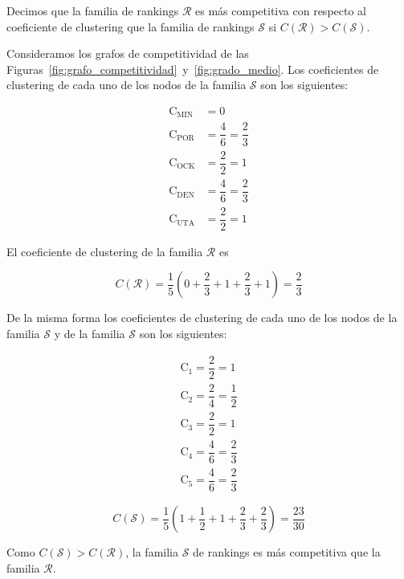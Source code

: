 \begin{defi}
Decimos que la familia de rankings $\mathcal{R}$ es más competitiva con respecto al coeficiente de clustering que la familia de rankings $\mathcal{S}$ si $C(\mathcal{R}) > C(\mathcal{S})$.
\end{defi}

\begin{ejemplo}
Consideramos los grafos de competitividad de las Figuras~\ref{fig:grafo_competitividad}~y~\ref{fig:grado_medio}. Los coeficientes de clustering de cada uno de los nodos de la familia $\mathcal{S}$ son los siguientes:

\begin{align*}
\mathrm{C}_\text{MIN} & =  0\\
\mathrm{C}_\text{POR} & = \dfrac{4}{6} = \dfrac{2}{3}\\
\mathrm{C}_\text{OCK} & = \dfrac{2}{2} = 1\\
\mathrm{C}_\text{DEN} & = \dfrac{4}{6} = \dfrac{2}{3}\\
\mathrm{C}_\text{UTA} & = \dfrac{2}{2} = 1
\end{align*}

El coeficiente de clustering de la familia $\mathcal{R}$ es 

\begin{equation*}
C(\mathcal{R}) = \dfrac{1}{5}\left( 0 + \dfrac{2}{3} + 1 + \dfrac{2}{3} + 1 \right) = \dfrac{2}{3}
\end{equation*}

De la misma forma los coeficientes de clustering de cada uno de los nodos de la familia $\mathcal{S}$ y de la familia $\mathcal{S}$ son los siguientes:

\begin{eqnarray*}
\mathrm{C}_\text{1} = \dfrac{2}{2} = 1\\
\mathrm{C}_\text{2} = \dfrac{2}{4} = \dfrac{1}{2}\\
\mathrm{C}_\text{3} = \dfrac{2}{2} = 1\\
\mathrm{C}_\text{4} = \dfrac{4}{6} = \dfrac{2}{3}\\
\mathrm{C}_\text{5} = \dfrac{4}{6} = \dfrac{2}{3}
\end{eqnarray*}

\begin{equation*}
C(\mathcal{S}) = \dfrac{1}{5}\left( 1 + \dfrac{1}{2} + 1 + \dfrac{2}{3} + \dfrac{2}{3} \right) = \dfrac{23}{30}
\end{equation*}

Como $C(\mathcal{S}) > C(\mathcal{R})$, la familia $\mathcal{S}$ de rankings es más competitiva que la familia $\mathcal{R}$.
 
\end{ejemplo}

